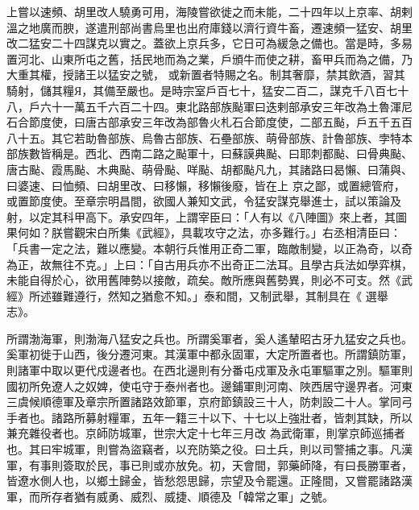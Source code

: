 \begin{pinyinscope}
 上嘗以速頻、胡里改人驍勇可用，海陵嘗欲徙之而未能，二十四年以上京率、胡剌溫之地廣而腴，遂遣刑部尚書烏里也出府庫錢以濟行資牛畜，遷速頻一猛安、胡里改二猛安二十四謀克以實之。蓋欲上京兵多，它日可為緩急之備也。當是時，多易置河北、山東所屯之舊，括民地而為之業，戶頒牛而使之耕，畜甲兵而為之備，乃大重其權，授諸王以猛安之號，
 或新置者特賜之名。制其奢靡，禁其飲酒，習其騎射，儲其糧Я，其備至嚴也。是時宗室戶百七十，猛安二百二，謀克千八百七十八，戶六十一萬五千六百二十四。東北路部族颭軍曰迭剌部承安三年改為土魯渾尼石合節度使，曰唐古部承安三年改為部魯火札石合節度使，二部五颭，戶五千五百八十五。其它若助魯部族、烏魯古部族、石壘部族、萌骨部族、計魯部族、孛特本部族數皆稱是。西北、西南二路之颭軍十，曰蘇謨典颭、曰耶刺都颭、曰骨典颭、唐古颭、霞馬颭、木典颭、萌骨颭、咩颭、胡都颭凡九，其諸路曰曷懶、曰蒲與、曰婆速、曰恤頻、曰胡里改、曰移懶，移懶後廢，皆在上
 京之鄙，或置總管府，或置節度使。至章宗明昌間，欲國人兼知文武，令猛安謀克舉進士，試以策論及射，以定其科甲高下。承安四年，上謂宰臣曰：「人有以《八陣圖》來上者，其圖果何如？朕嘗觀宋白所集《武經》，具載攻守之法，亦多難行。」右丞相清臣曰：「兵書一定之法，難以應變。本朝行兵惟用正奇二軍，臨敵制變，以正為奇，以奇為正，故無往不克。」上曰：「自古用兵亦不出奇正二法耳。且學古兵法如學弈棋，未能自得於心，欲用舊陣勢以接敵，疏矣。敵所應與舊勢異，則必不可支。然《武經》所述雖難遵行，然知之猶愈不知。」泰和間，又制武舉，其制具在《
 選舉志》。



 所謂渤海軍，則渤海八猛安之兵也。所謂奚軍者，奚人遙輦昭古牙九猛安之兵也。奚軍初徙于山西，後分遷河東。其漢軍中都永固軍，大定所置者也。所謂鎮防軍，則諸軍中取以更代戍邊者也。在西北邊則有分番屯戍軍及永屯軍驅軍之別。驅軍則國初所免遼人之奴婢，使屯守于泰州者也。邊鋪軍則河南、陜西居守邊界者。河東三虞候順德軍及章宗所置諸路效節軍，京府節鎮設三十人，防刺設二十人。掌同弓手者也。諸路所募射糧軍，五年一籍三十以下、十七以上強壯者，皆刺其缺，所以兼充雜役者也。京師防城軍，世宗大定十七年三月改
 為武衛軍，則掌京師巡捕者也。其曰牢城軍，則嘗為盜竊者，以充防築之役。曰土兵，則以司警捕之事。凡漢軍，有事則簽取於民，事已則或亦放免。初，天會間，郭藥師降，有曰長勝軍者，皆遼水側人也，以鄉土歸金，皆愁怨思歸，宗望及令罷還。正隆間，又嘗罷諸路漢軍，而所存者猶有威勇、威烈、威捷、順德及「韓常之軍」之號。




\end{pinyinscope}
